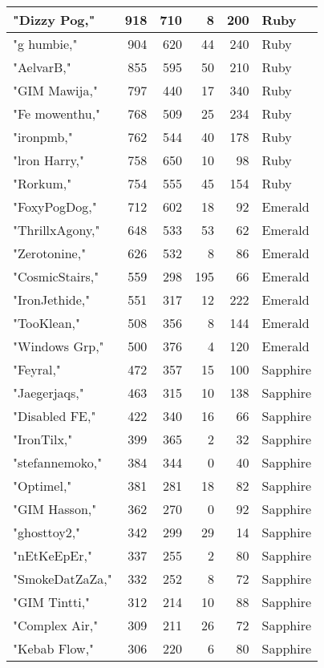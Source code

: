 \documentclass{article}
\begin{document}
\begin{table}[htbp]
\begin{tabular}{|l|r|r|r|r|l|}
"Dizzy Pog," & 918 & 710 & 8 & 200 & Ruby \\ \hline
"g humbie," & 904 & 620 & 44 & 240 & Ruby \\ \hline
"AelvarB," & 855 & 595 & 50 & 210 & Ruby \\ \hline
"GIM Mawija," & 797 & 440 & 17 & 340 & Ruby \\ \hline
"Fe mowenthu," & 768 & 509 & 25 & 234 & Ruby \\ \hline
"ironpmb," & 762 & 544 & 40 & 178 & Ruby \\ \hline
"lron Harry," & 758 & 650 & 10 & 98 & Ruby \\ \hline
"Rorkum," & 754 & 555 & 45 & 154 & Ruby \\ \hline
"FoxyPogDog," & 712 & 602 & 18 & 92 & Emerald \\ \hline
"ThrillxAgony," & 648 & 533 & 53 & 62 & Emerald \\ \hline
"Zerotonine," & 626 & 532 & 8 & 86 & Emerald \\ \hline
"CosmicStairs," & 559 & 298 & 195 & 66 & Emerald \\ \hline
"IronJethide," & 551 & 317 & 12 & 222 & Emerald \\ \hline
"TooKlean," & 508 & 356 & 8 & 144 & Emerald \\ \hline
"Windows Grp," & 500 & 376 & 4 & 120 & Emerald \\ \hline
"Feyral," & 472 & 357 & 15 & 100 & Sapphire \\ \hline
"Jaegerjaqs," & 463 & 315 & 10 & 138 & Sapphire \\ \hline
"Disabled FE," & 422 & 340 & 16 & 66 & Sapphire \\ \hline
"IronTilx," & 399 & 365 & 2 & 32 & Sapphire \\ \hline
"stefannemoko," & 384 & 344 & 0 & 40 & Sapphire \\ \hline
"Optimel," & 381 & 281 & 18 & 82 & Sapphire \\ \hline
"GIM Hasson," & 362 & 270 & 0 & 92 & Sapphire \\ \hline
"ghosttoy2," & 342 & 299 & 29 & 14 & Sapphire \\ \hline
"nEtKeEpEr," & 337 & 255 & 2 & 80 & Sapphire \\ \hline
"SmokeDatZaZa," & 332 & 252 & 8 & 72 & Sapphire \\ \hline
"GIM Tintti," & 312 & 214 & 10 & 88 & Sapphire \\ \hline
"Complex Air," & 309 & 211 & 26 & 72 & Sapphire \\ \hline
"Kebab Flow," & 306 & 220 & 6 & 80 & Sapphire \\ \hline

\end{tabular}
\end{table}
\end{document}
